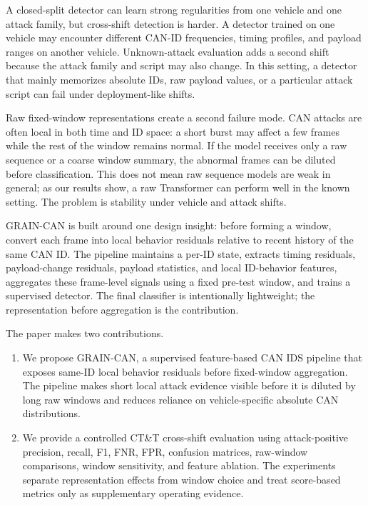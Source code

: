 \documentclass[runningheads]{llncs}
\newcommand{\method}{GRAIN-CAN}
\begin{document}
A closed-split detector can learn strong regularities from one vehicle and one attack family, but cross-shift detection is harder. A detector trained on one vehicle may encounter different CAN-ID frequencies, timing profiles, and payload ranges on another vehicle. Unknown-attack evaluation adds a second shift because the attack family and script may also change. In this setting, a detector that mainly memorizes absolute IDs, raw payload values, or a particular attack script can fail under deployment-like shifts.

Raw fixed-window representations create a second failure mode. CAN attacks are often local in both time and ID space: a short burst may affect a few frames while the rest of the window remains normal. If the model receives only a raw sequence or a coarse window summary, the abnormal frames can be diluted before classification. This does not mean raw sequence models are weak in general; as our results show, a raw Transformer can perform well in the known setting. The problem is stability under vehicle and attack shifts.

\method{} is built around one design insight: before forming a window, convert each frame into local behavior residuals relative to recent history of the same CAN ID. The pipeline maintains a per-ID state, extracts timing residuals, payload-change residuals, payload statistics, and local ID-behavior features, aggregates these frame-level signals using a fixed pre-test window, and trains a supervised detector. The final classifier is intentionally lightweight; the representation before aggregation is the contribution.

The paper makes two contributions.
\begin{enumerate}
  \item We propose \method{}, a supervised feature-based CAN IDS pipeline that exposes same-ID local behavior residuals before fixed-window aggregation. The pipeline makes short local attack evidence visible before it is diluted by long raw windows and reduces reliance on vehicle-specific absolute CAN distributions.
  \item We provide a controlled CT\&T cross-shift evaluation using attack-positive precision, recall, F1, FNR, FPR, confusion matrices, raw-window comparisons, window sensitivity, and feature ablation. The experiments separate representation effects from window choice and treat score-based metrics only as supplementary operating evidence.
\end{enumerate}
\end{document}
